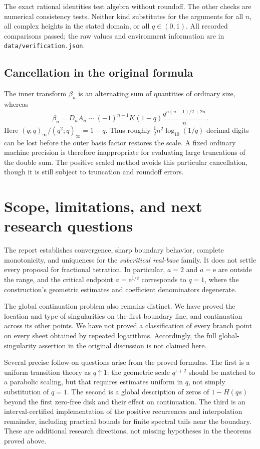 \documentclass[11pt,letterpaper]{article}
\theoremstyle{definition}\newtheorem{definition}[theorem]{Definition}
\theoremstyle{remark}\newtheorem{remark}[theorem]{Remark}
\newcommand{\ee}{\mathrm e}
\numberwithin{equation}{section}
\begin{document}
The exact rational identities test algebra without roundoff. The other checks are numerical consistency tests. Neither kind substitutes for the arguments for all $n$, all complex heights in the stated domain, or all $q\in(0,1)$. All recorded comparisons passed; the raw values and environment information are in \texttt{data/verification.json}.

\subsection{Cancellation in the original formula}
The inner transform $\beta_n$ is an alternating sum of quantities of ordinary size, whereas
\begin{equation}\label{eq:betascale}
 \beta_n=D_nA_n
 \sim(-1)^{n+1}K(1-q)\frac{q^{n(n-1)/2+2n}}n.
\end{equation}
Here $(q;q)_\infty/(q^2;q)_\infty=1-q$. Thus roughly $\tfrac12n^2\log_{10}(1/q)$ decimal digits can be lost before the outer basis factor restores the scale. A fixed ordinary machine precision is therefore inappropriate for evaluating large truncations of the double sum. The positive scaled method avoids this particular cancellation, though it is still subject to truncation and roundoff errors.

\section{Scope, limitations, and next research questions}

The report establishes convergence, sharp boundary behavior, complete monotonicity, and uniqueness for the \emph{subcritical real-base} family. It does not settle every proposal for fractional tetration. In particular, $a=2$ and $a=\ee$ are outside the range, and the critical endpoint $a=\ee^{1/\ee}$ corresponds to $q=1$, where the construction's geometric estimates and coefficient denominators degenerate.

The global continuation problem also remains distinct. We have proved the location and type of singularities on the first boundary line, and continuation across its other points. We have not proved a classification of every branch point on every sheet obtained by repeated logarithms. Accordingly, the full global-singularity assertion in the original discussion is not claimed here.

Several precise follow-on questions arise from the proved formulas. The first is a uniform transition theory as $q\uparrow1$: the geometric scale $q^{z+2}$ should be matched to a parabolic scaling, but that requires estimates uniform in $q$, not simply substitution of $q=1$. The second is a global description of zeros of $1-H(qs)$ beyond the first zero-free disk and their effect on continuation. The third is an interval-certified implementation of the positive recurrences and interpolation remainder, including practical bounds for finite spectral tails near the boundary. These are additional research directions, not missing hypotheses in the theorems proved above.
\end{document}
